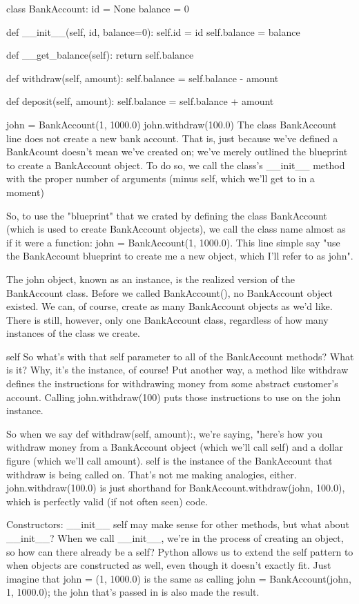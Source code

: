 class BankAccount:
    id = None
    balance = 0

    def __init__(self, id, balance=0):
        self.id = id
        self.balance = balance

    def __get_balance(self):
        return self.balance

    def withdraw(self, amount):
        self.balance = self.balance - amount

    def deposit(self, amount):
        self.balance = self.balance + amount

john = BankAccount(1, 1000.0)
john.withdraw(100.0)
The class BankAccount line does not create a new bank account. That is, just because we've defined a BankAcount doesn't mean we've created on; we've merely outlined the blueprint to create a BankAccount object. To do so, we call the class's __init__ method with the proper number of arguments (minus self, which we'll get to in a moment)

So, to use the "blueprint" that we crated by defining the class BankAccount (which is used to create BankAccount objects), we call the class name almost as if it were a function: john = BankAccount(1, 1000.0). This line simple say "use the BankAccount blueprint to create me a new object, which I'll refer to as john".

The john object, known as an instance, is the realized version of the BankAccount class. Before we called BankAccount(), no BankAccount object existed. We can, of course, create as many BankAccount objects as we'd like. There is still, however, only one BankAccount class, regardless of how many instances of the class we create.

self
So what's with that self parameter to all of the BankAccount methods? What is it? Why, it's the instance, of course! Put another way, a method like withdraw defines the instructions for withdrawing money from some abstract customer's account. Calling john.withdraw(100) puts those instructions to use on the john instance.

So when we say def withdraw(self, amount):, we're saying, "here's how you withdraw money from a BankAccount object (which we'll call self) and a dollar figure (which we'll call amount). self is the instance of the BankAccount that  withdraw is being called on. That's not me making analogies, either. john.withdraw(100.0) is just shorthand for BankAccount.withdraw(john, 100.0), which is perfectly valid (if not often seen) code.

Constructors: __init__
self may make sense for other methods, but what about __init__? When we call __init__, we're in the process of creating an object, so how can there already be a self? Python allows us to extend the self pattern to when objects are constructed as well, even though it doesn't exactly fit. Just imagine that john = (1, 1000.0) is the same as calling john = BankAccount(john, 1, 1000.0); the john that's passed in is also made the result.

